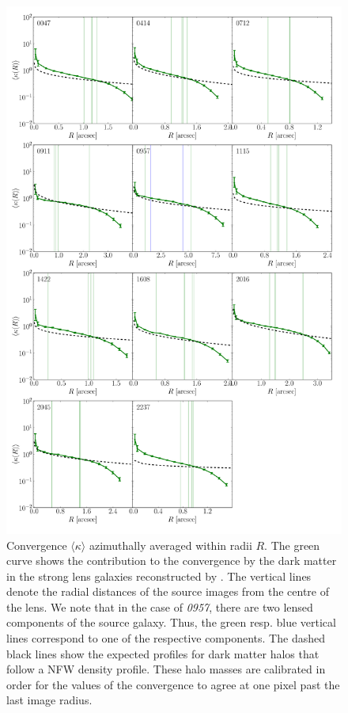 \documentclass[useAMS,usenatbib]{mn2e}
\begin{document}
\begin{figure}
  \centering
  \includegraphics[width=.8\linewidth]{Figures/kappaplot.pdf}
  \caption[width=\linewidth]{Convergence $\langle\kappa\rangle$ azimuthally averaged within radii $R$. The green curve shows the contribution to the convergence by the dark matter in the strong lens galaxies reconstructed by \GLASS. The vertical lines denote the radial distances of the source images from the centre of the lens. We note that in the case of \textit{0957}, there are two lensed components of the source galaxy. Thus, the green resp. blue vertical lines correspond to one of the respective components. The dashed black lines show the expected profiles for dark matter halos that follow a NFW density profile. These halo masses are calibrated in order for the values of the convergence to agree at one pixel past the last image radius.}
  \label{fig:kappaplot}
\end{figure}
\end{document}
